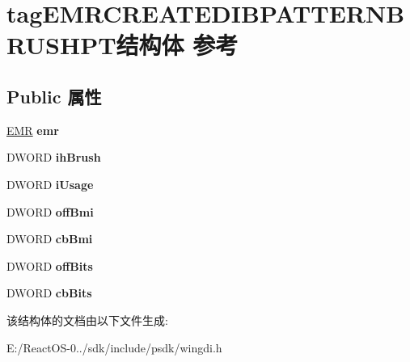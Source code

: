 \hypertarget{structtag_e_m_r_c_r_e_a_t_e_d_i_b_p_a_t_t_e_r_n_b_r_u_s_h_p_t}{}\section{tag\+E\+M\+R\+C\+R\+E\+A\+T\+E\+D\+I\+B\+P\+A\+T\+T\+E\+R\+N\+B\+R\+U\+S\+H\+P\+T结构体 参考}
\label{structtag_e_m_r_c_r_e_a_t_e_d_i_b_p_a_t_t_e_r_n_b_r_u_s_h_p_t}
\subsection*{Public 属性}
\begin{DoxyCompactItemize}
\item 
\mbox{\label{structtag_e_m_r_c_r_e_a_t_e_d_i_b_p_a_t_t_e_r_n_b_r_u_s_h_p_t_a30f80efefe6af1f8c02f6a38c0b38e0d}} 
\hyperlink{structtag_e_m_r}{E\+MR} {\bfseries emr}
\item 
\mbox{\label{structtag_e_m_r_c_r_e_a_t_e_d_i_b_p_a_t_t_e_r_n_b_r_u_s_h_p_t_afcbc02800c27b291a8ff84a4121a4156}} 
D\+W\+O\+RD {\bfseries ih\+Brush}
\item 
\mbox{\label{structtag_e_m_r_c_r_e_a_t_e_d_i_b_p_a_t_t_e_r_n_b_r_u_s_h_p_t_ad9346d2dd6ceb78173d77683c2a65d8a}} 
D\+W\+O\+RD {\bfseries i\+Usage}
\item 
\mbox{\label{structtag_e_m_r_c_r_e_a_t_e_d_i_b_p_a_t_t_e_r_n_b_r_u_s_h_p_t_af9b9d70b551f8a803ceb8faa9fd2b025}} 
D\+W\+O\+RD {\bfseries off\+Bmi}
\item 
\mbox{\label{structtag_e_m_r_c_r_e_a_t_e_d_i_b_p_a_t_t_e_r_n_b_r_u_s_h_p_t_a827c11fcc22134509fc1c34afc5c6226}} 
D\+W\+O\+RD {\bfseries cb\+Bmi}
\item 
\mbox{\label{structtag_e_m_r_c_r_e_a_t_e_d_i_b_p_a_t_t_e_r_n_b_r_u_s_h_p_t_a03a36675c04596acd77bd2c784649198}} 
D\+W\+O\+RD {\bfseries off\+Bits}
\item 
\mbox{\label{structtag_e_m_r_c_r_e_a_t_e_d_i_b_p_a_t_t_e_r_n_b_r_u_s_h_p_t_af11511d3db6aa35f116dfcf52ac0aa1a}} 
D\+W\+O\+RD {\bfseries cb\+Bits}
\end{DoxyCompactItemize}


该结构体的文档由以下文件生成\+:\begin{DoxyCompactItemize}
\item 
E\+:/\+React\+O\+S-\/0../sdk/include/psdk/wingdi.\+h\end{DoxyCompactItemize}

